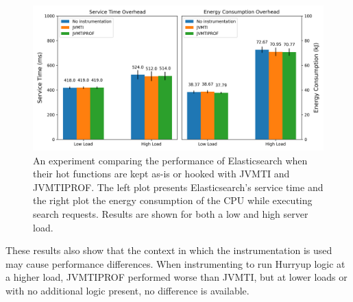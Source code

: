 \begin{figure}[ht]
\centering
\includegraphics[width=1.0\textwidth]{src/figure/overhead.png}
\caption{An experiment comparing the performance of Elasticsearch when their hot functions are kept as-is or hooked with JVMTI and JVMTIPROF. The left plot presents Elasticsearch's service time and the right plot the energy consumption of the CPU while executing search requests. Results are shown for both a low and high server load.}
\label{fig:overhead}
\end{figure}

These results also show that the context in which the instrumentation is used may cause performance differences. When instrumenting to run Hurryup logic at a higher load, JVMTIPROF performed worse than JVMTI, but at lower loads or with no additional logic present, no difference is available.
